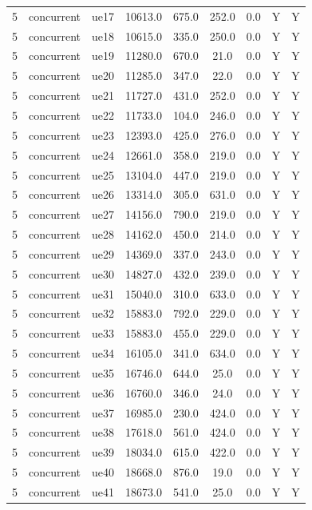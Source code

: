 \begin{table}[ht]
\begin{tabular}{|c|c|c|c|c|c|c|c|c|}
5 & concurrent & ue17 & 10613.0 & 675.0 & 252.0 & 0.0 & Y & Y \\
5 & concurrent & ue18 & 10615.0 & 335.0 & 250.0 & 0.0 & Y & Y \\
5 & concurrent & ue19 & 11280.0 & 670.0 & 21.0 & 0.0 & Y & Y \\
5 & concurrent & ue20 & 11285.0 & 347.0 & 22.0 & 0.0 & Y & Y \\
5 & concurrent & ue21 & 11727.0 & 431.0 & 252.0 & 0.0 & Y & Y \\
5 & concurrent & ue22 & 11733.0 & 104.0 & 246.0 & 0.0 & Y & Y \\
5 & concurrent & ue23 & 12393.0 & 425.0 & 276.0 & 0.0 & Y & Y \\
5 & concurrent & ue24 & 12661.0 & 358.0 & 219.0 & 0.0 & Y & Y \\
5 & concurrent & ue25 & 13104.0 & 447.0 & 219.0 & 0.0 & Y & Y \\
5 & concurrent & ue26 & 13314.0 & 305.0 & 631.0 & 0.0 & Y & Y \\
5 & concurrent & ue27 & 14156.0 & 790.0 & 219.0 & 0.0 & Y & Y \\
5 & concurrent & ue28 & 14162.0 & 450.0 & 214.0 & 0.0 & Y & Y \\
5 & concurrent & ue29 & 14369.0 & 337.0 & 243.0 & 0.0 & Y & Y \\
5 & concurrent & ue30 & 14827.0 & 432.0 & 239.0 & 0.0 & Y & Y \\
5 & concurrent & ue31 & 15040.0 & 310.0 & 633.0 & 0.0 & Y & Y \\
5 & concurrent & ue32 & 15883.0 & 792.0 & 229.0 & 0.0 & Y & Y \\
5 & concurrent & ue33 & 15883.0 & 455.0 & 229.0 & 0.0 & Y & Y \\
5 & concurrent & ue34 & 16105.0 & 341.0 & 634.0 & 0.0 & Y & Y \\
5 & concurrent & ue35 & 16746.0 & 644.0 & 25.0 & 0.0 & Y & Y \\
5 & concurrent & ue36 & 16760.0 & 346.0 & 24.0 & 0.0 & Y & Y \\
5 & concurrent & ue37 & 16985.0 & 230.0 & 424.0 & 0.0 & Y & Y \\
5 & concurrent & ue38 & 17618.0 & 561.0 & 424.0 & 0.0 & Y & Y \\
5 & concurrent & ue39 & 18034.0 & 615.0 & 422.0 & 0.0 & Y & Y \\
5 & concurrent & ue40 & 18668.0 & 876.0 & 19.0 & 0.0 & Y & Y \\
5 & concurrent & ue41 & 18673.0 & 541.0 & 25.0 & 0.0 & Y & Y \\

\end{tabular}
\end{table}
